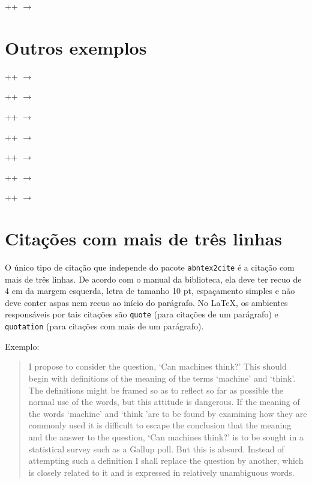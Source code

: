\documentclass{fei}
\begin{document}
	\latexinline+\citeyear{galilei_dialogue_1953}+ \(\to\) \citeyear{galilei_dialogue_1953}

	\section{Outros exemplos}

	\latexinline++ \(\to\) 

	\latexinline++ \(\to\) 

	\latexinline++ \(\to\) 

	\latexinline++ \(\to\) 

	\latexinline++ \(\to\) 

	\latexinline++ \(\to\) 

	\latexinline++ \(\to\) 
	
	\section{Citações com mais de três linhas}
	
	O único tipo de citação que independe do pacote \texttt{abntex2cite} é a citação com mais de três linhas. De acordo com o manual da biblioteca, ela deve ter recuo de 4 cm da margem esquerda, letra de tamanho 10 pt, espaçamento simples e não deve conter aspas nem recuo ao início do parágrafo. No \LaTeX, os ambientes responsáveis por tais citações são \texttt{quote} (para citações de um parágrafo) e \texttt{quotation} (para citações com mais de um parágrafo).
	
	Exemplo:
	
	\begin{quote}		
	I propose to consider the question, `Can machines think?' This should begin with definitions of the meaning of the terms `machine' and `think'. The definitions might be framed so as to reflect so far as possible the normal use of the words, but this attitude is dangerous. If the meaning of the words `machine' and `think 'are to be found by examining how they are commonly used it is difficult to escape the conclusion that the meaning and the answer to the question, `Can machines think?' is to be sought in a statistical survey such as a Gallup poll. But this is absurd. Instead of attempting such a definition I shall replace the question by another, which is closely related to it and is expressed in relatively unambiguous words. \cite{j:turing50}
	\end{quote}
\end{document}
